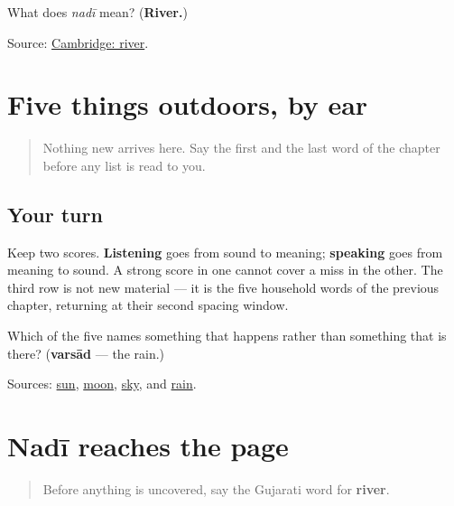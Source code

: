 \begin{tcolorbox}[breakable,colback=teal!4,colframe=teal!35!black,title={Before you move on}]
What does \emph{nadī} mean? (\textbf{River.})

Source: \href{https://dictionary.cambridge.org/dictionary/english-gujarati/river}{Cambridge: river}.
\end{tcolorbox}
\section[Practice]{Five things outdoors, by ear}

\label{lesson:GU-C29-sky-five}



\begin{quote}
Nothing new arrives here. Say the first and the last word of the chapter before any list is read to you.
\end{quote}

\subsection*{Your turn}
Keep two scores. \textbf{Listening} goes from sound to meaning; \textbf{speaking} goes from meaning to sound. A strong score in one cannot cover a miss in the other. The third row is not new material — it is the five household words of the previous chapter, returning at their second spacing window.

\begin{tcolorbox}[breakable,colback=teal!4,colframe=teal!35!black,title={Before you move on}]
Which of the five names something that happens rather than something that is there? (\textbf{varsād} — the rain.)

Sources: \href{https://dictionary.cambridge.org/dictionary/english-gujarati/sun}{sun}, \href{https://dictionary.cambridge.org/dictionary/english-gujarati/moon}{moon}, \href{https://dictionary.cambridge.org/dictionary/english-gujarati/sky}{sky}, and \href{https://dictionary.cambridge.org/dictionary/english-gujarati/rain}{rain}.
\end{tcolorbox}
\section[Practice]{Nadī reaches the page}

\label{lesson:GU-C29-nadi}



\begin{quote}
Before anything is uncovered, say the Gujarati word for \textbf{river}.
\end{quote}

